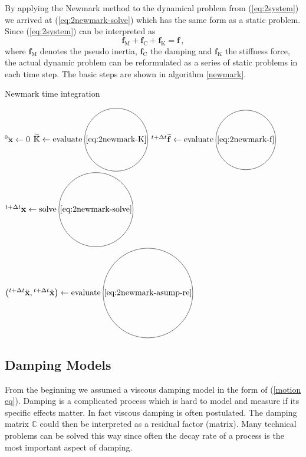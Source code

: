 \documentclass[conference]{journal}
\newcommand*\circled[1]{\tikz[baseline=(char.base)]{
   \node[shape=circle,draw,inner sep=1pt] (char) {#1};}}
\newcommand{\bb}[1]{\mathbb{#1}}
\newcommand{\B}[1]{\mathbf{#1}}
\newcommand{\Bx}{\B{x}}
\newcommand{\xtt}{{}^{t+\Delta t}\Bx}
\newcommand{\vtt}{{}^{t+\Delta t}\dot{\Bx}}
\newcommand{\att}{{}^{t+\Delta t}\ddot{\Bx}}
\newcommand{\M}{\bb{M}}
\newcommand{\C}{\bb{C}}
\newcommand{\K}{\bb{K}}
\begin{document}
	By applying the Newmark method to the dynamical problem from (\ref{eq:2system}) we arrived at (\ref{eq:2newmark-solve}) which has the same form as a static problem. Since (\ref{eq:2system}) can be interpreted as
	\begin{equation} \label{eq:2system-forces}
	\B{f}_\mathrm{M} + \B{f}_\mathrm{C} + \B{f}_\mathrm{K} = \B{f}\,,
	\end{equation}
	where $\B{f}_\mathrm{M}$ denotes the pseudo inertia, $\B{f}_\mathrm{C}$ the damping and $\B{f}_\mathrm{K}$ the stiffness force, the actual dynamic problem can be reformulated as a series of static problems in each time step. The basic steps are shown in algorithm \ref{newmark}.

	\begin{algorithm}
	\caption{Newmark time integration}\label{newmark}
	\begin{algorithmic}[1]
	\Procedure{Newmark}{$\M,\, \C,\, \K,\, \B{f}(t),\, \Delta t,\, t_\mathrm{end},\, {}^{0}\Bx,\, {}^{0}\dot{\Bx}$}
	\State ${}^{0}\ddot{\Bx} \gets 0$
	\State $\widetilde{\K} \gets \mathrm{evaluate} \; \circled{\ref{eq:2newmark-K}}$
		\State ${}^{t+\Delta t}\widetilde{\B{f}} \gets \mathrm{evaluate} \; \circled{\ref{eq:2newmark-f}}$
		\State $\xtt \gets \mathrm{solve} \; \circled{\ref{eq:2newmark-solve}}$
		\State $\left(\att,\vtt\right) \gets \mathrm{evaluate} \; \circled{\ref{eq:2newmark-asump-re}}$
	\EndFor
	\EndProcedure
	\end{algorithmic}
	\end{algorithm}

	\subsection{Damping Models}
	From the beginning we assumed a viscous damping model in the form of (\ref{motion eq}). Damping is a complicated process which is hard to model and measure if its specific effects matter. In fact viscous damping is often postulated. The damping matrix $\C$ could then be interpreted as a residual factor (matrix). Many technical problems can be solved this way since often the decay rate of a process is the most important aspect of damping.
\end{document}
